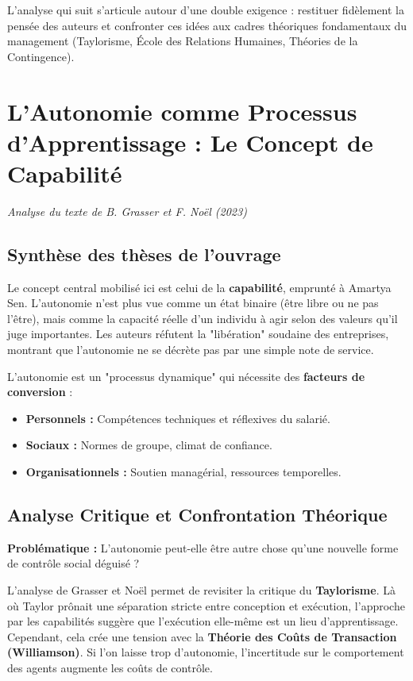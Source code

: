 \documentclass[12pt,a4paper]{report}
\begin{document}
L'analyse qui suit s'articule autour d'une double exigence : restituer fidèlement la pensée des auteurs et confronter ces idées aux cadres théoriques fondamentaux du management (Taylorisme, École des Relations Humaines, Théories de la Contingence).

\hr
\vspace{1cm}

\section{L’Autonomie comme Processus d’Apprentissage : Le Concept de Capabilité}
\textit{Analyse du texte de B. Grasser et F. Noël (2023)}

\subsection{Synthèse des thèses de l'ouvrage}
Le concept central mobilisé ici est celui de la \textbf{capabilité}, emprunté à Amartya Sen. L'autonomie n'est plus vue comme un état binaire (être libre ou ne pas l'être), mais comme la capacité réelle d'un individu à agir selon des valeurs qu'il juge importantes. Les auteurs réfutent la "libération" soudaine des entreprises, montrant que l'autonomie ne se décrète pas par une simple note de service. 

L'autonomie est un "processus dynamique" qui nécessite des \textbf{facteurs de conversion} :
\begin{itemize}
    \item \textbf{Personnels :} Compétences techniques et réflexives du salarié.
    \item \textbf{Sociaux :} Normes de groupe, climat de confiance.
    \item \textbf{Organisationnels :} Soutien managérial, ressources temporelles.
\end{itemize}

\subsection{Analyse Critique et Confrontation Théorique}
\textbf{Problématique :} L'autonomie peut-elle être autre chose qu'une nouvelle forme de contrôle social déguisé ?

L'analyse de Grasser et Noël permet de revisiter la critique du \textbf{Taylorisme}. Là où Taylor prônait une séparation stricte entre conception et exécution, l'approche par les capabilités suggère que l'exécution elle-même est un lieu d'apprentissage. Cependant, cela crée une tension avec la \textbf{Théorie des Coûts de Transaction (Williamson)}. Si l'on laisse trop d'autonomie, l'incertitude sur le comportement des agents augmente les coûts de contrôle. 
\end{document}

